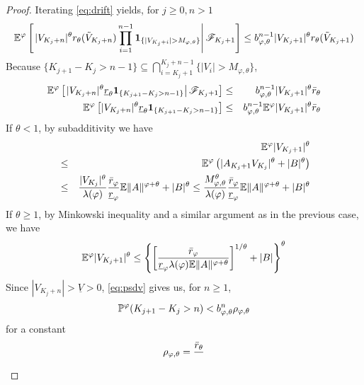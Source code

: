 \documentclass[aoas,preprint]{imsart}
\numberwithin{equation}{section}
\theoremstyle{plain}
\begin{document}
\begin{proof}
  Iterating \eqref{eq:drift} yields, for $j \geq 0, n > 1$
  \[
  \mathbb{E}^\varphi \left[
    \left.
    |V_{K_j + n}|^\theta r_{\theta}(\tilde V_{K_j + n})
    \prod_{i=1}^{n-1}\mathbf{1}_{\{|V_{K_j + i}| > M_{\varphi, \theta}\}}
    \right| \mathscr F_{K_j + 1}
    \right]
  \leq b_{\varphi, \theta}^{n-1} |V_{K_j + 1}|^\theta r_{\theta}(\tilde V_{K_j+1})
  \]
  Because
  $\{K_{j+1} - K_j > n - 1\} \subseteq \bigcap_{i=K_j + 1}^{K_j + n-1}\{|V_i| > M_{\varphi, \theta}\}$,
  \begin{eqnarray}
    \E^\varphi \left[\left.
      |V_{K_j + n}|^\theta \underline r_{\theta}
      \1{K_{j+1} - K_j > n - 1}
      \right| \mathscr F_{K_j + 1}
      \right]
    &\leq&
    b_{\varphi, \theta}^{n-1} |V_{K_j + 1}|^\theta \bar r_{\theta}
    \nonumber \\
    \E^\varphi \left[
      |V_{K_j + n}|^\theta \underline r_{\theta}
      \1{K_{j+1} - K_j > n - 1}
      \right]
    &\leq&
    b_{\varphi, \theta}^{n-1} \E^\varphi |V_{K_j + 1}|^\theta \bar
    r_{\theta}
    \label{eq:psdv}
  \end{eqnarray}
  If $\theta < 1$, by subadditivity we have
  \begin{eqnarray*}
    &&
    \mathbb{E}^\varphi |V_{K_j + 1}|^\theta \\
    &\leq&
    \mathbb{E}^\varphi \left(
    |A_{K_j + 1} V_{K_j}|^\theta + |B|^\theta
    \right) \\
    &\leq&
          {|V_{K_j}|^\theta \over \lambda(\varphi)}
          {\bar r_\varphi \over \underline r_\varphi}
          \mathbb{E} \|A\|^{\varphi + \theta} + |B|^\theta
          \leq
              {M_{\varphi, \theta}^\theta \over \lambda(\varphi)}
              {\bar r_\varphi \over \underline r_\varphi}
              \mathbb{E} \|A\|^{\varphi + \theta} + |B|^\theta
  \end{eqnarray*}
  If $\theta \geq 1$, by Minkowski inequality and a similar argument
  as in the previous case, we have
  \[
  \mathbb{E}^\varphi |V_{K_j + 1}|^\theta
  \leq
  \left\{
  \left[
    {\bar r_\varphi} \over \underline r_\varphi \lambda(\varphi)
    \mathbb{E} \|A\|^{\varphi + \theta}
    \right]^{1/\theta}
  + |B|
  \right\}^\theta
  \]
  Since $|V_{K_j + n}| > \underline V > 0$, \eqref{eq:psdv} gives us,
  for $n \geq 1$,
  \begin{equation}
    \label{eq:frth}
    \P^\varphi (K_{j+1} - K_j > n) < b_{\varphi, \theta}^n \rho_{\varphi, \theta}
  \end{equation}
  for a constant
  \[
  \rho_{\varphi, \theta} = {
    \bar r_{\theta}
    \over
}\]
\end{proof}
\end{document}
